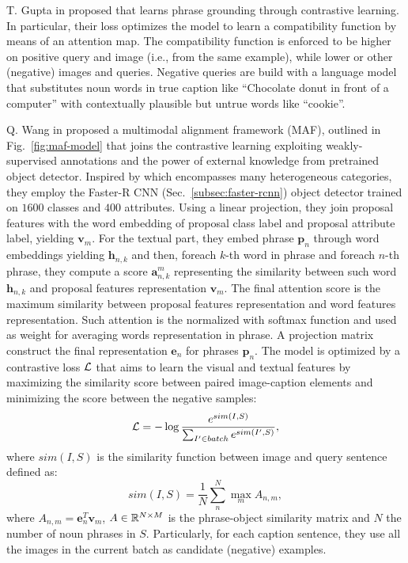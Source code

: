 T. Gupta \etal{} in \cite{gupta2020contrastive} proposed that learns
phrase grounding through contrastive learning. In particular, their
loss optimizes the model to learn a compatibility function by means of
an attention map. The compatibility function is enforced to be higher
on positive query and image (i.e., from the same example), while lower
or other (negative) images and queries. Negative queries are build
with a language model that substitutes noun words in true caption like
``Chocolate donut in front of a computer'' with contextually plausible
but untrue words like ``cookie''.

Q. Wang \etal{} in \cite{wang2020maf} proposed a multimodal alignment
framework (MAF), outlined in Fig.~\ref{fig:maf-model} that joins the
contrastive learning exploiting weakly-supervised annotations and the
power of external knowledge from pretrained object detector. Inspired
by \cite{wang2019phrase} which encompasses many heterogeneous
categories, they employ the Faster-R CNN
(Sec.~\ref{subsec:faster-rcnn}) object detector trained on $1600$
classes and $400$ attributes. Using a linear projection, they join
proposal features with the word embedding of proposal class label and
proposal attribute label, yielding $\bm{v}_m$. For the textual part,
they embed phrase $\bm{p}_n$ through word embeddings yielding
$\bm{h}_{n,k}$ and then, foreach $k$-th word in phrase and foreach
$n$-th phrase, they compute a score $\bm{a}^m_{n,k}$ representing the
similarity between such word $\bm{h}_{n,k}$ and proposal features
representation $\bm{v}_m$. The final attention score is the maximum
similarity between proposal features representation and word features
representation. Such attention is the normalized with softmax function
and used as weight for averaging words representation in phrase. A
projection matrix construct the final representation $\bm{e}_n$ for
phrases $\bm{p}_n$. The model is optimized by a contrastive loss
$\mathcal{L}$ that aims to learn the visual and textual features by
maximizing the similarity score between paired image-caption elements
and minimizing the score between the negative samples:
\begin{equation}
  \mathcal{L} = - \log \frac{e^{sim(I, S)}}{ \sum_{I' \in batch} e^{sim(I', S)} },
\end{equation}
where $sim(I, S)$ is the similarity function between image and query
sentence defined as:
\begin{equation}
  sim(I, S) = \frac{1}{N} \sum^N_n \max_m A_{n,m},
\end{equation}
where $A_{n,m} = \bm{e}^T_n \bm{v}_m$, $A \in \mathbb{R}^{N \times M}$ is
the phrase-object similarity matrix and $N$ the number of noun phrases
in $S$. Particularly, for each caption sentence, they use all the
images in the current batch as candidate (negative) examples.

